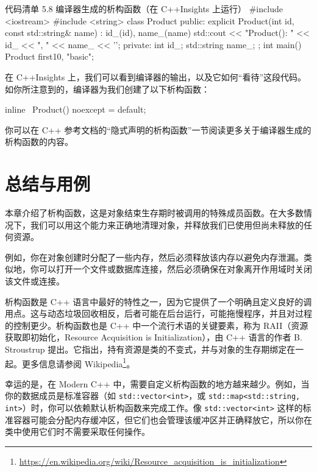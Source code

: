 \begin{codeboxt}[cpp]{代码清单 5.8 编译器生成的析构函数（在 C++Insights 上运行）}
#include <iostream>
#include <string>
class Product {
public:
explicit Product(int id, const std::string& name)
: id_(id), name_(name) {
std::cout << "Product(): " << id_ << ", " << name_ << '\n';
}
private:
int id_;
std::string name_;
};
int main() {
Product first{10, "basic"};
}
\end{codeboxt}

在 C++Insights 上，我们可以看到编译器的输出，以及它如何“看待”这段代码。如你所注意到的，编译器为我们创建了以下析构函数：

\begin{codebox}[cpp]
inline ~Product() noexcept = default;
\end{codebox}

你可以在 C++ 参考文档的“隐式声明的析构函数”一节阅读更多关于编译器生成的析构函数的内容。

\section{总结与用例}

本章介绍了析构函数，这是对象结束生存期时被调用的特殊成员函数。在大多数情况下，我们可以用这个能力来正确地清理对象，并释放我们已使用但尚未释放的任何资源。

例如，你在对象创建时分配了一些内存，然后必须释放该内存以避免内存泄漏。类似地，你可以打开一个文件或数据库连接，然后必须确保在对象离开作用域时关闭该文件或连接。

析构函数是 C++ 语言中最好的特性之一，因为它提供了一个明确且定义良好的调用点。这与动态垃圾回收相反，后者可能在后台运行，可能拖慢程序，并且对过程的控制更少。析构函数也是 C++ 中一个流行术语的关键要素，称为 RAII（资源获取即初始化，Resource Acquisition is Initialization），由 C++ 语言的作者 B. Stroustrup 提出。它指出，持有资源是类的不变式，并与对象的生存期绑定在一起。更多信息请参阅 Wikipedia\footnote{\url{https://en.wikipedia.org/wiki/Resource_acquisition_is_initialization}}。

幸运的是，在 Modern C++ 中，需要自定义析构函数的地方越来越少。例如，当你的数据成员是标准容器（如 \texttt{std::vector<int>}，或 \texttt{std::map<std::string, int>}）时，你可以依赖默认析构函数来完成工作。像 \texttt{std::vector<int>} 这样的标准容器可能会分配内存缓冲区，但它们也会管理该缓冲区并正确释放它，所以你在类中使用它们时不需要采取任何操作。
